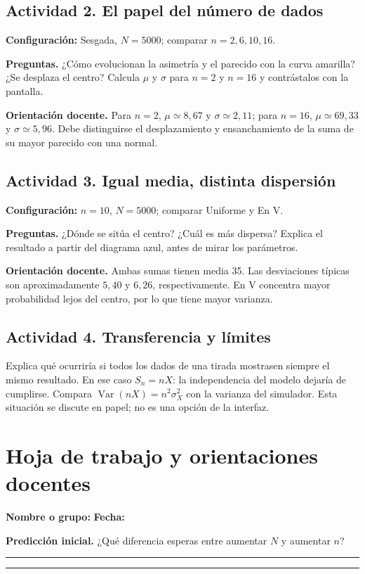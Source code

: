 \documentclass[11pt,a4paper]{article}
\begin{document}
\subsection{Actividad 2. El papel del número de dados}
\textbf{Configuración:} Sesgada, $N=5000$; comparar $n=2,6,10,16$.

\textbf{Preguntas.} ¿Cómo evolucionan la asimetría y el parecido con la curva amarilla? ¿Se desplaza el centro? Calcula $\mu$ y $\sigma$ para $n=2$ y $n=16$ y contrástalos con la pantalla.

\textbf{Orientación docente.} Para $n=2$, $\mu\simeq8{,}67$ y $\sigma\simeq2{,}11$; para $n=16$, $\mu\simeq69{,}33$ y $\sigma\simeq5{,}96$. Debe distinguirse el desplazamiento y ensanchamiento de la suma de su mayor parecido con una normal.

\subsection{Actividad 3. Igual media, distinta dispersión}
\textbf{Configuración:} $n=10$, $N=5000$; comparar Uniforme y En V.

\textbf{Preguntas.} ¿Dónde se sitúa el centro? ¿Cuál es más dispersa? Explica el resultado a partir del diagrama azul, antes de mirar los parámetros.

\textbf{Orientación docente.} Ambas sumas tienen media 35. Las desviaciones típicas son aproximadamente $5{,}40$ y $6{,}26$, respectivamente. En V concentra mayor probabilidad lejos del centro, por lo que tiene mayor varianza.

\subsection{Actividad 4. Transferencia y límites}
Explica qué ocurriría si todos los dados de una tirada mostrasen siempre el mismo resultado. En ese caso $S_n=nX$: la independencia del modelo dejaría de cumplirse. Compara $\operatorname{Var}(nX)=n^2\sigma_X^2$ con la varianza del simulador. Esta situación se discute en papel; no es una opción de la interfaz.

\clearpage\section{Hoja de trabajo y orientaciones docentes}
\textbf{Nombre o grupo:} \hrulefill\quad\textbf{Fecha:} \hrulefill

\textbf{Predicción inicial.} ¿Qué diferencia esperas entre aumentar $N$ y aumentar $n$?\par
\rule{\linewidth}{.2pt}\par\vspace{6mm}\rule{\linewidth}{.2pt}
\end{document}
